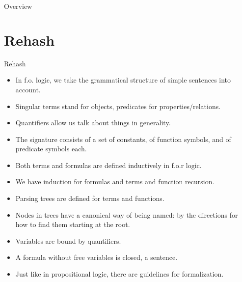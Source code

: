 \setcounter{framenumber}{264}
\begin{frame}
  \maketitle
\end{frame}

\begin{frame}{Overview}
\tableofcontents
\end{frame}

\section{Rehash}
\begin{frame}{Rehash}
	
\begin{itemize}
	
		\item In f.o. logic, we take the grammatical structure of simple sentences into account.
		
		\item  \alert{Singular terms stand for objects, predicates for properties/relations.}
		
		\item \alert{Quantifiers allow us talk about things in generality.}
		
		\item \alert{The signature consists of a set of constants, of function symbols, and of predicate symbols each.}
		
		\item Both terms and formulas are defined inductively in f.o.r logic.
		
		\item \alert{We have induction for formulas and terms and function recursion.}
		
		\item Parsing trees are defined for terms and functions.
		
		\item Nodes in trees have a canonical way of being named: by the directions for how to find them starting at the root. 
		
		\item \alert{Variables are bound by quantifiers.}
		
		\item \alert{A formula without free variables is closed, a sentence.}
		
		\item Just like in propositional logic, there are guidelines for formalization.
					
	\end{itemize}

\end{frame}
		

